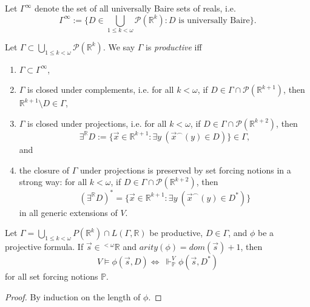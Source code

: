 \documentclass[12pt]{article}
\numberwithin{equation}{section}
\begin{document}
\begin{defi}
Let $\Gamma^{\infty}$ denote the set of all universally Baire sets of reals, i.e. 
\begin{equation*}
    \Gamma^{\infty} := \{D \in \bigcup_{1 \leq k < \omega} \mathcal{P}(\mathbb{R}^k) : D \text{ is universally Baire}\}.
\end{equation*}
\end{defi}

\begin{defi}
Let $\Gamma \subset \bigcup_{1 \leq k < \omega} \mathcal{P}(\mathbb{R}^k)$. We say $\Gamma$ is \emph{productive} iff
\begin{enumerate}[label=(\arabic*), leftmargin=40pt]
    \item $\Gamma \subset \Gamma^{\infty}$,
    \item $\Gamma$ is closed under complements, i.e. for all $k < \omega$, if $D \in \Gamma \cap \mathcal{P}(\mathbb{R}^{k+1})$, then $\mathbb{R}^{k+1} \setminus D \in \Gamma$,
    \item $\Gamma$ is closed under projections, i.e. for all $k < \omega$, if $D \in \Gamma \cap \mathcal{P}(\mathbb{R}^{k+2})$, then
    \begin{equation*}
        \exists^{\mathbb{R}} D := \{\Vec{x} \in \mathbb{R}^{k+1} : \exists y \ (\Vec{x}^{\frown}(y) \in D)\} \in \Gamma,
    \end{equation*}
    and
    \item the closure of $\Gamma$ under projections is preserved by set forcing notions in a strong way: for all $k < \omega$, if $D \in \Gamma \cap \mathcal{P}(\mathbb{R}^{k+2})$, then
    \begin{equation*}
        (\exists^{\mathbb{R}} D)^* = \{\Vec{x} \in \mathbb{R}^{k+1} : \exists y \ (\Vec{x}^{\frown}(y) \in D^*)\}
    \end{equation*}
    in all generic extensions of $V$.
\end{enumerate}
\end{defi}

\begin{lem}\label{prod}
Let $\Gamma  = \bigcup_{1 \leq k < \omega} P(\mathbb{R}^{k}) \cap L(\Gamma, \mathbb{R})$ be productive, $D \in \Gamma$, and $\phi$ be a projective formula. If $\Vec{s} \in {^{< \omega}{\mathbb{R}}}$ and $arity(\phi) = dom(\Vec{s}) + 1$, then 
\begin{equation*}
    V \models \phi(\Vec{s}, D) \iff \ \Vdash^V_{\mathbb{P}} \phi(\Vec{s}, D^*)
\end{equation*}
for all set forcing notions $\mathbb{P}$.
\end{lem}
\begin{proof}
By induction on the length of $\phi$.
\end{proof}
\end{document}
